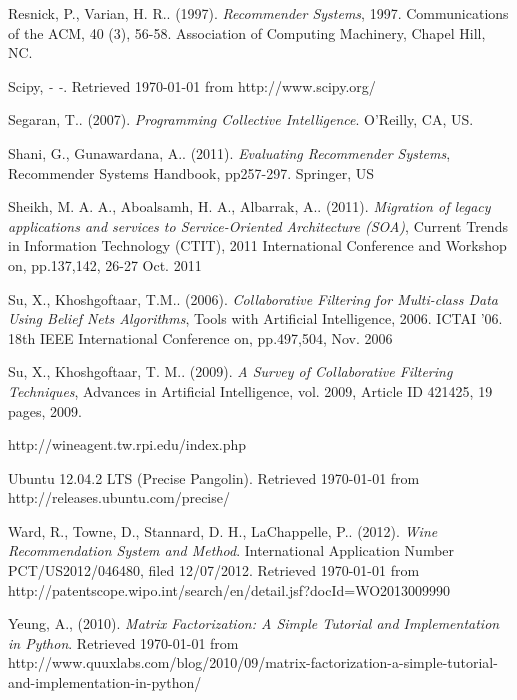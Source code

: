 \begin{thebibliography}{9}
     Resnick, P., Varian, H. R.. (1997). \emph{Recommender Systems}, 1997. Communications of the ACM, 40 (3), 56-58. Association of Computing Machinery, Chapel Hill, NC.

     Scipy, \emph{- -}. Retrieved \today{} from http://www.scipy.org/

     Segaran, T.. (2007). \emph{Programming Collective Intelligence}. O'Reilly, CA, US.

     Shani, G., Gunawardana, A.. (2011). \emph{Evaluating Recommender Systems}, Recommender Systems Handbook, pp257-297. Springer, US

     Sheikh, M. A. A., Aboalsamh, H. A., Albarrak, A.. (2011). \emph{Migration of legacy applications and services to Service-Oriented Architecture (SOA)}, Current Trends in Information Technology (CTIT), 2011 International Conference and Workshop on, pp.137,142, 26-27 Oct. 2011

     Su, X., Khoshgoftaar, T.M.. (2006). \emph{Collaborative Filtering for Multi-class Data Using Belief Nets Algorithms}, Tools with Artificial Intelligence, 2006. ICTAI '06. 18th IEEE International Conference on, pp.497,504, Nov. 2006

     Su, X., Khoshgoftaar, T. M.. (2009). \emph{A Survey of Collaborative Filtering Techniques}, Advances in Artificial Intelligence, vol. 2009, Article ID 421425, 19 pages, 2009.

     http://wineagent.tw.rpi.edu/index.php

     Ubuntu 12.04.2 LTS (Precise Pangolin). Retrieved \today{} from http://releases.ubuntu.com/precise/

     Ward, R., Towne, D., Stannard, D. H., LaChappelle, P.. (2012). \emph{Wine Recommendation System and Method}. International Application Number PCT/US2012/046480, filed 12/07/2012. Retrieved \today{} from http://patentscope.wipo.int/search/en/detail.jsf?docId=WO2013009990

     Yeung, A., (2010). \emph{Matrix Factorization: A Simple Tutorial and Implementation in Python}. Retrieved \today{} from http://www.quuxlabs.com/blog/2010/09/matrix-factorization-a-simple-tutorial-and-implementation-in-python/ 

\end{thebibliography}
\normalsize

